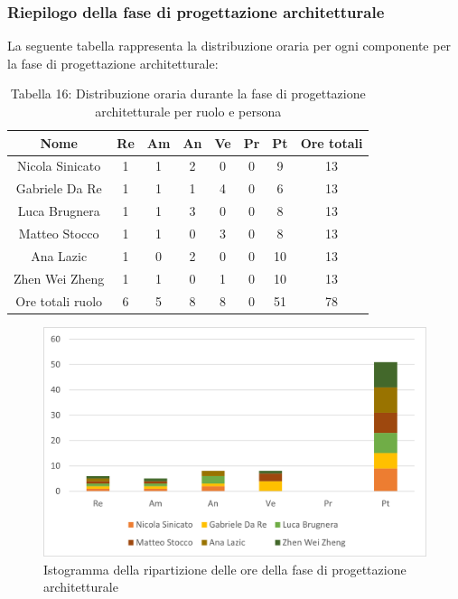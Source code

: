 \subsubsection{Riepilogo della fase di progettazione architetturale }
%
La seguente tabella rappresenta la distribuzione oraria per ogni componente per la fase di progettazione architetturale:
\begin{table}[h]
	\setlength\extrarowheight{5pt}
	\centering
	\begin{tabularx}{\textwidth}{|ccccccc|c|}
		\hline
		\rowcolor{white}
		\textbf{Nome} & \textbf{Re} & \textbf{Am} & \textbf{An} & \textbf{Ve} & \textbf{Pr}& \textbf{Pt} & \textbf{Ore totali} \\
		\hline
		Nicola Sinicato &1&1&2&0&0&9&13 \\
		Gabriele Da Re &1&1&1&4&0&6&13 \\
		Luca Brugnera &1&1&3&0&0&8&13 \\
		Matteo Stocco &1&1&0&3&0&8&13 \\
		Ana Lazic &1&0&2&0&0&10&13 \\
		Zhen Wei Zheng &1&1&0&1&0&10&13 \\
		\hline
		Ore totali ruolo &6&5&8&8&0&51&78 \\
		\hline
	\end{tabularx}
	\vspace{10pt}
	\caption{Tabella 16: Distribuzione oraria durante la fase di progettazione architetturale per ruolo e persona}
\end{table}
\begin{figure}[H]
    \centering
    \includegraphics[scale=0.6]{img/grafi preventivo/istogrammi/architetturale/complessivo.png}
    \caption{Istogramma della ripartizione delle ore della fase di progettazione architetturale}
\end{figure}
